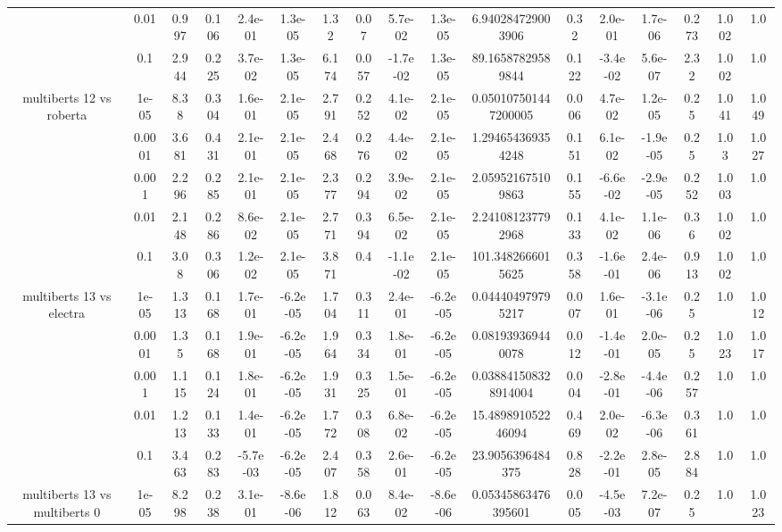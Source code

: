 \begin{tabular}{|c|c|c|c|c|c|c|c|c|c|c|c|c|c|c|c|c|}
 & 0.01 & 0.997 & 0.106 & 2.4e-01 & 1.3e-05 & 1.32 & 0.07 & 5.7e-02 & 1.3e-05 & 6.940284729003906 & 0.32 & 2.0e-01 & 1.7e-06 & 0.273 & 1.002 & 1.0 \\
 & 0.1 & 2.944 & 0.225 & 3.7e-02 & 1.3e-05 & 6.174 & 0.057 & -1.7e-02 & 1.3e-05 & 89.16587829589844 & 0.122 & -3.4e-02 & 5.6e-07 & 2.32 & 1.002 & 1.0 \\
\hline
\multirow{5}{*}{multiberts 12 vs roberta } & 1e-05 & 8.38 & 0.304 & 1.6e-01 & 2.1e-05 & 2.791 & 0.252 & 4.1e-02 & 2.1e-05 & 0.050107501447200005 & 0.006 & 4.7e-02 & 1.2e-05 & 0.25 & 1.041 & 1.049 \\
 & 0.0001 & 3.681 & 0.431 & 2.1e-01 & 2.1e-05 & 2.468 & 0.276 & 4.4e-02 & 2.1e-05 & 1.294654369354248 & 0.151 & 6.1e-02 & -1.9e-05 & 0.25 & 1.03 & 1.027 \\
 & 0.001 & 2.296 & 0.285 & 2.1e-01 & 2.1e-05 & 2.377 & 0.294 & 3.9e-02 & 2.1e-05 & 2.059521675109863 & 0.155 & -6.6e-02 & -2.9e-05 & 0.252 & 1.003 & 1.0 \\
 & 0.01 & 2.148 & 0.286 & 8.6e-02 & 2.1e-05 & 2.771 & 0.394 & 6.5e-02 & 2.1e-05 & 2.241081237792968 & 0.133 & 4.1e-02 & 1.1e-06 & 0.36 & 1.002 & 1.0 \\
 & 0.1 & 3.08 & 0.306 & 1.2e-02 & 2.1e-05 & 3.871 & 0.4 & -1.1e-02 & 2.1e-05 & 101.3482666015625 & 0.358 & -1.6e-01 & 2.4e-06 & 0.913 & 1.002 & 1.0 \\
\hline
\multirow{5}{*}{multiberts 13 vs electra } & 1e-05 & 1.313 & 0.168 & 1.7e-01 & -6.2e-05 & 1.704 & 0.311 & 2.4e-01 & -6.2e-05 & 0.044404979795217 & 0.007 & 1.6e-01 & -3.1e-06 & 0.25 & 1.0 & 1.012 \\
 & 0.0001 & 1.35 & 0.168 & 1.9e-01 & -6.2e-05 & 1.964 & 0.334 & 1.8e-01 & -6.2e-05 & 0.081939369440078 & 0.012 & -1.4e-01 & 2.0e-05 & 0.25 & 1.023 & 1.017 \\
 & 0.001 & 1.115 & 0.124 & 1.8e-01 & -6.2e-05 & 1.931 & 0.325 & 1.5e-01 & -6.2e-05 & 0.038841508328914004 & 0.004 & -2.8e-01 & -4.4e-06 & 0.257 & 1.0 & 1.0 \\
 & 0.01 & 1.213 & 0.133 & 1.4e-01 & -6.2e-05 & 1.772 & 0.308 & 6.8e-02 & -6.2e-05 & 15.489891052246094 & 0.469 & 2.0e-02 & -6.3e-06 & 0.361 & 1.0 & 1.0 \\
 & 0.1 & 3.463 & 0.283 & -5.7e-03 & -6.2e-05 & 2.407 & 0.358 & 2.6e-01 & -6.2e-05 & 23.9056396484375 & 0.828 & -2.2e-01 & 2.8e-05 & 2.884 & 1.0 & 1.0 \\
\hline
\multirow{5}{*}{multiberts 13 vs multiberts 0} & 1e-05 & 8.298 & 0.238 & 3.1e-01 & -8.6e-06 & 1.812 & 0.063 & 8.4e-02 & -8.6e-06 & 0.05345863476395601 & 0.005 & -4.5e-03 & 7.2e-07 & 0.25 & 1.0 & 1.023 \\

\end{tabular}
